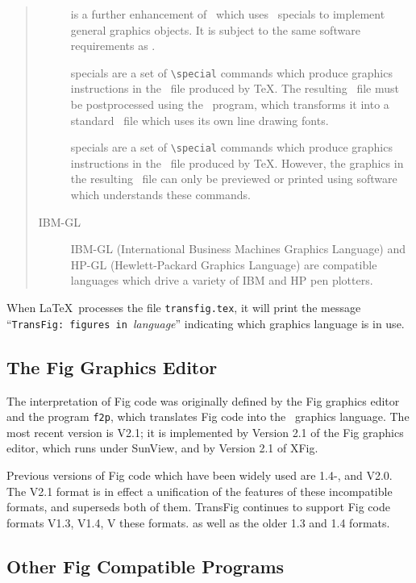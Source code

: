 \begin{quote}
\begin{description}
\item[\EEPIC]
	is a further enhancement of \EPIC\ which uses \tpic\ specials
		to implement general graphics objects.
	It is subject to the same software requirements as \tpic.

\item[\textyl]
	specials are a set of \verb|\special| commands which 
		produce graphics instructions in the \DVI\ file
		produced by \TeX.
The resulting \DVI\ file must be postprocessed using the \textyl\ program,
	which transforms it into a standard \DVI\ file which uses its own 
	line drawing fonts.
	
\item[\tpic]
	specials are a set of \verb|\special| commands which 
		produce graphics instructions in the \DVI\ file
		produced by \TeX.
	However, the graphics in the resulting \DVI\ file can only be
		previewed or printed using software which understands
		these commands.

\item[IBM-GL]
	IBM-GL (International Business Machines Graphics Language) and
	HP-GL (Hewlett-Packard Graphics Language) are compatible
	languages which drive a variety of IBM and HP pen plotters.

\end{description}
\end{quote}
%
When \LaTeX\ processes the file {\tt transfig.tex}, it will print the message
	 \linebreak ``{\verb|TransFig: figures in |}{\it language}''
	indicating which graphics language is in use.

\subsection{The Fig Graphics Editor}
\label{s:fig}
The interpretation of Fig code was originally defined by 
	the Fig graphics editor and the program {\tt f2p},
	which translates Fig code into the \PIC\ graphics language. 
The most recent version is V2.1; it is implemented by Version 2.1 of the
	Fig graphics editor, which runs under SunView, and by Version 2.1
	of XFig.

Previous versions of Fig code which have been widely used are 1.4-\TFX,
	and V2.0.
The V2.1 format is in effect a unification of the features of these
	incompatible formats, and superseds both of them.
TransFig continues to support Fig code formats V1.3, V1.4, V
 these formats. as well as the older 1.3 and 1.4 formats.

\subsection{Other Fig Compatible Programs}
\label{s:pic2fig}

